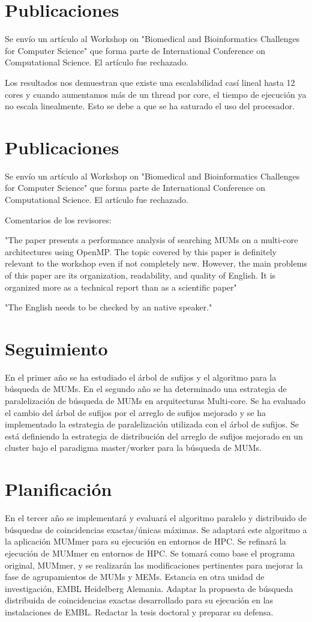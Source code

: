 \documentclass[12pt,a4paper]{article}
\begin{document}
\section{Publicaciones}
Se envío un artículo al Workshop on "Biomedical and Bioinformatics Challenges for Computer Science" que forma parte de International Conference on Computational Science. El artículo fue rechazado.

Los resultados nos demuestran que existe una escalabilidad casí lineal hasta 12 cores y cuando aumentamos más de un thread por core, el tiempo de ejecución ya no escala linealmente. Esto se debe a que se ha saturado el uso del procesador.
\section{Publicaciones}
Se envío un artículo al Workshop on "Biomedical and Bioinformatics Challenges for Computer Science" que forma parte de International Conference on Computational Science. El artículo fue rechazado.

Comentarios de los revisores:

"The paper presents a performance analysis of searching MUMs on a multi-core architectures using OpenMP. The topic covered by this paper is definitely relevant to the workshop even if not completely new. However, the main problems of this paper are its organization, readability, and quality of English. It is organized more as a technical report than as a scientific paper"

"The English needs to be checked by an native speaker."
\section{Seguimiento}
En el primer año se ha estudiado el árbol de sufijos y el algoritmo para la búsqueda de MUMs.
En el segundo año se ha determinado una estrategia de paralelización de búsqueda de MUMs en arquitecturas Multi-core. Se ha evaluado el cambio del árbol de sufijos por el arreglo de sufijos mejorado y se ha implementado la estrategia de paralelización utilizada con el árbol de sufijos. Se está definiendo la estrategia de distribución del arreglo de sufijos mejorado en un cluster bajo el paradigma master/worker para la búsqueda de MUMs.
\section{Planificación}
En el tercer año se implementará y evaluará   el algoritmo paralelo y distribuido de búsquedas de 
coincidencias exactas/únicas máximas. 
Se adaptará este algoritmo a la aplicación MUMmer para su ejecución en entornos de HPC.
Se refinará la ejecución de MUMmer en entornos de HPC. Se tomará como base el programa original, MUMmer, y 
se realizarán las modificaciones pertinentes para mejorar la fase de agrupamientos de MUMs y MEMs. 
Estancia en otra unidad de investigación, EMBL Heidelberg Alemania. Adaptar la propuesta de búsqueda distribuida de coincidencias exactas desarrollado para su ejecución en las instalaciones de EMBL. 
Redactar la tesis doctoral y preparar su defensa.
\end{document}
